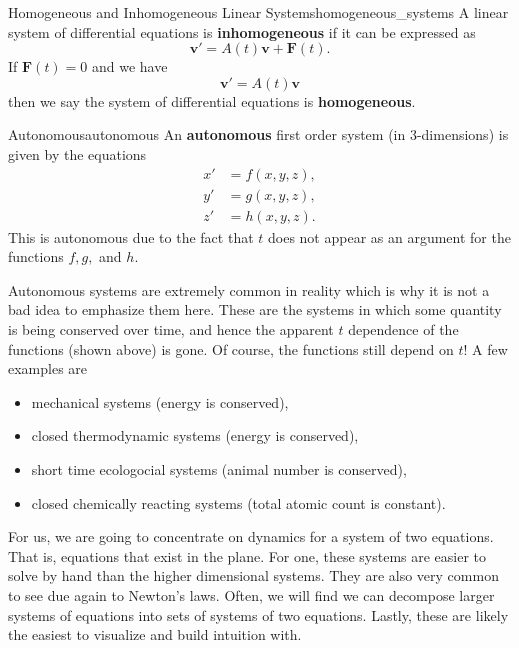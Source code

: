         \begin{df}{Homogeneous and Inhomogeneous Linear Systems}{homogeneous_systems}
            A linear system of differential equations is 
            \textbf{inhomogeneous} if it can be expressed as
            \[
            \mathbf{v}' = A(t)\mathbf{v}+\mathbf{F}(t).
            \]
            If $\mathbf{F}(t)=0$ and we have
            \[
            \mathbf{v}' = A(t)\mathbf{v}
            \]
            then we say the system of differential equations is \textbf{homogeneous}.
        \end{df}
        
        \begin{df}{Autonomous}{autonomous}
        An \textbf{autonomous} first order system (in 3-dimensions) is given by the equations
        \begin{align*}
        x' &= f(x,y,z),\\
        y' &= g(x,y,z),\\
        z' &= h(x,y,z).
        \end{align*}
        This is autonomous due to the fact that $t$ does not appear as an argument for the functions $f,g,$ and $h$.
        \end{df}
        
        Autonomous systems are extremely common in reality which is why it is not a bad idea to emphasize them here.  These are the systems in which some quantity is being conserved over time, and hence the apparent $t$ dependence of the functions (shown above) is gone.  Of course, the functions still depend on $t$!  A few examples are
        \begin{itemize}
            \item mechanical systems (energy is conserved),
            \item closed thermodynamic systems (energy is conserved),
            \item short time ecologocial systems (animal number is conserved), 
            \item closed chemically reacting systems (total atomic count is constant).
        \end{itemize}
        
        For us, we are going to concentrate on dynamics for a system of two equations.  That is, equations that exist in the plane.  For one, these systems are easier to solve by hand than the higher dimensional systems.  They are also very common to see due again to Newton's laws.  Often, we will find we can decompose larger systems of equations into sets of systems of two equations. Lastly, these are likely the easiest to visualize and build intuition with.  
        
